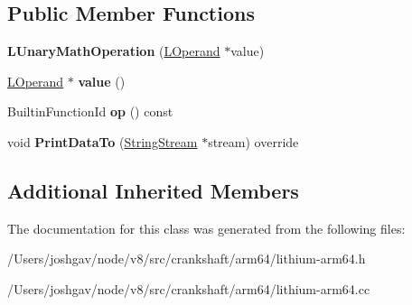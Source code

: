 \subsection*{Public Member Functions}
\begin{DoxyCompactItemize}
\item 
{\bfseries L\+Unary\+Math\+Operation} (\hyperlink{classv8_1_1internal_1_1_l_operand}{L\+Operand} $\ast$value)\hypertarget{classv8_1_1internal_1_1_l_unary_math_operation_a9fdd8c62b95d9ea92dc9aeab646d130f}{}\label{classv8_1_1internal_1_1_l_unary_math_operation_a9fdd8c62b95d9ea92dc9aeab646d130f}

\item 
\hyperlink{classv8_1_1internal_1_1_l_operand}{L\+Operand} $\ast$ {\bfseries value} ()\hypertarget{classv8_1_1internal_1_1_l_unary_math_operation_a4f40cd05abc9eca5d7bdc0c6998d3396}{}\label{classv8_1_1internal_1_1_l_unary_math_operation_a4f40cd05abc9eca5d7bdc0c6998d3396}

\item 
Builtin\+Function\+Id {\bfseries op} () const \hypertarget{classv8_1_1internal_1_1_l_unary_math_operation_ac5cbcc7512a36c5dacbbca9448aa4b50}{}\label{classv8_1_1internal_1_1_l_unary_math_operation_ac5cbcc7512a36c5dacbbca9448aa4b50}

\item 
void {\bfseries Print\+Data\+To} (\hyperlink{classv8_1_1internal_1_1_string_stream}{String\+Stream} $\ast$stream) override\hypertarget{classv8_1_1internal_1_1_l_unary_math_operation_a5f9cad54f56143dd72bc3cc9347472df}{}\label{classv8_1_1internal_1_1_l_unary_math_operation_a5f9cad54f56143dd72bc3cc9347472df}

\end{DoxyCompactItemize}
\subsection*{Additional Inherited Members}


The documentation for this class was generated from the following files\+:\begin{DoxyCompactItemize}
\item 
/\+Users/joshgav/node/v8/src/crankshaft/arm64/lithium-\/arm64.\+h\item 
/\+Users/joshgav/node/v8/src/crankshaft/arm64/lithium-\/arm64.\+cc\end{DoxyCompactItemize}
